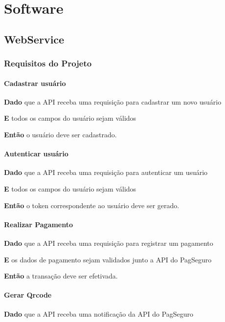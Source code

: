 \chapter[Software]{Software}


\section[WebService]{WebService}

\subsection{Requisitos do Projeto}

\subsubsection{Cadastrar usuário}

\textbf{Dado} que a API receba uma requisição para cadastrar um novo usuário

\textbf{E} todos os campos do usuário sejam válidos

\textbf{Então} o usuário deve ser cadastrado.

\subsubsection{Autenticar usuário}

\textbf{Dado} que a API receba uma requisição para autenticar um usuário

\textbf{E} todos os campos do usuário sejam válidos

\textbf{Então} o token correspondente ao usuário deve ser gerado.

\subsubsection{Realizar Pagamento}

\textbf{Dado} que a API receba uma requisição para registrar um pagamento

\textbf{E} os dados de pagamento sejam validados junto a API do PagSeguro

\textbf{Então} a transação deve ser efetivada.

\subsubsection{Gerar Qrcode}

\textbf{Dado} que a API receba uma notificação da API do PagSeguro

